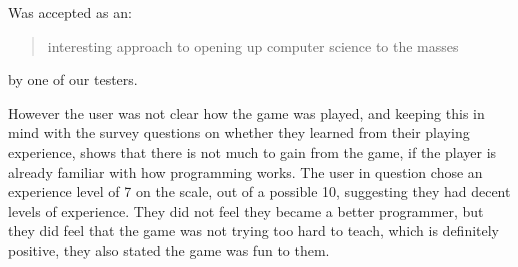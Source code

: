 Was accepted as an: 

\begin{quotation}interesting approach to opening up computer science to the masses\end{quotation} by one of our testers.

However the user was not clear how the game was played, and keeping this in mind with the survey questions on whether they learned from their playing experience, shows that there is not much to gain from the game, if the player is already familiar with how programming works. The user in question chose an experience level of 7 on the scale, out of a possible 10, suggesting they had decent levels of experience. They did not feel they became a better programmer, but they did feel that the game was not trying too hard to teach, which is definitely positive, they also stated the game was fun to them.